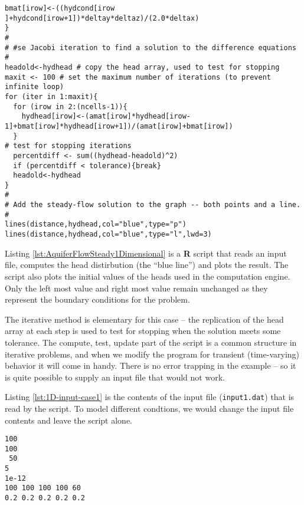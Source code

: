 \begin{lstlisting}[caption=R code demonstrating an Aquifer Flow Simulator for Steady Flow \\ This fragment of code contains ..., label=lst:AquiferFlowSteady1Dimensional]
  bmat[irow]<-((hydcond[irow  ]+hydcond[irow+1])*deltay*deltaz)/(2.0*deltax)
}
#
# #se Jacobi iteration to find a solution to the difference equations
# 
headold<-hydhead # copy the head array, used to test for stopping 
maxit <- 100 # set the maximum number of iterations (to prevent infinite loop)
for (iter in 1:maxit){
  for (irow in 2:(ncells-1)){
    hydhead[irow]<-(amat[irow]*hydhead[irow-1]+bmat[irow]*hydhead[irow+1])/(amat[irow]+bmat[irow])
  }
# test for stopping iterations
  percentdiff <- sum((hydhead-headold)^2)
  if (percentdiff < tolerance){break}
  headold<-hydhead
}
#
# Add the steady-flow solution to the graph -- both points and a line.
#
lines(distance,hydhead,col="blue",type="p")
lines(distance,hydhead,col="blue",type="l",lwd=3)
\end{lstlisting}

Listing \ref{lst:AquiferFlowSteady1Dimensional} is a \textbf{R} script that reads an input file, computes the head distirbution (the ``blue line'') and plots the result.   The script also plots the initial values of the heads used in the computation engine.  Only the left most value and right most value remain unchanged as they represent the boundary conditions for the problem.

The iterative method is elementary for this case -- the replication of the head array at each step is used to test for stopping when the solution meets some tolerance.  The compute, test, update part of the script is a common structure in iterative problems, and when we modify the program for transient (time-varying) behavior it will come in handy.   There is no error trapping in the example -- so it is quite possible to supply an input file that would not work.  

Listing \ref{lst:1D-input-case1} is the contents of the input file (\texttt{input1.dat}) that is read by the script. 
To model different condtions, we would change the input file contents and leave the script alone.

\begin{lstlisting}[caption= Input File for Example Problem \\ This fragment of code contains ..., label=lst:1D-input-case1]
100
100
 50
5
1e-12
100 100 100 100 60
0.2 0.2 0.2 0.2 0.2
\end{lstlisting}

